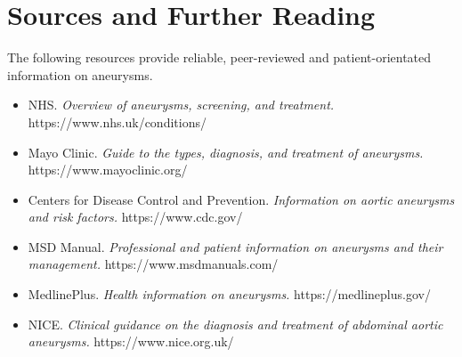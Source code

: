 \section*{Sources and Further Reading}
The following resources provide reliable, peer-reviewed and patient-orientated information on aneurysms.

\begin{itemize}
    \item NHS. \textit{Overview of aneurysms, screening, and treatment.} https://www.nhs.uk/conditions/
    \item Mayo Clinic. \textit{Guide to the types, diagnosis, and treatment of aneurysms.} https://www.mayoclinic.org/
    \item Centers for Disease Control and Prevention. \textit{Information on aortic aneurysms and risk factors.} https://www.cdc.gov/
    \item MSD Manual. \textit{Professional and patient information on aneurysms and their management.} https://www.msdmanuals.com/
    \item MedlinePlus. \textit{Health information on aneurysms.} https://medlineplus.gov/
    \item NICE. \textit{Clinical guidance on the diagnosis and treatment of abdominal aortic aneurysms.} https://www.nice.org.uk/
\end{itemize}
